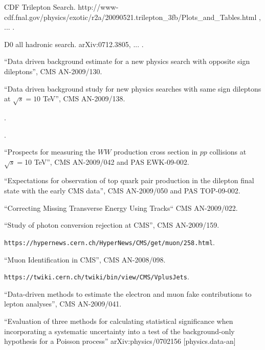 \begin{thebibliography}{99}

 {CDF Trilepton Search. http://www-cdf.fnal.gov/physics/exotic/r2a/20090521.trilepton\_3fb/Plots\_and\_Tables.html }, ... .

 {D0 all hadronic search. arXiv:0712.3805}, ... .


 {``Data driven background estimate for a new physics search with opposite sign dileptons''}, CMS AN-2009/130.

 {``Data driven background study for new physics searches with same sign dileptons at $\sqrt{s} = 10 $ TeV''}, CMS AN-2009/138.

.

.

 {``Prospects for measuring the $WW$ production cross section in $pp$ collisions at $\sqrt s = $10 TeV''}, CMS AN-2009/042 and PAS EWK-09-002.

 {``Expectations for observation of top quark pair production in the dilepton final state with the early CMS data''}, CMS AN-2009/050 and PAS TOP-09-002.

 {``Correcting Missing Transverse Energy Using Tracks``} CMS AN-2009/022.

 {``Study of photon conversion rejection at CMS''}, CMS AN-2009/159.

 {\tt https://hypernews.cern.ch/HyperNews/CMS/get/muon/258.html}.

 {``Muon Identification in CMS''}, CMS AN-2008/098.

 {\tt https://twiki.cern.ch/twiki/bin/view/CMS/VplusJets}.

 {``Data-driven methods to estimate the electron and muon fake contributions to lepton analyses''}, CMS AN-2009/041.

 {``Evaluation of three methods for calculating statistical significance when incorporating a systematic uncertainty into a test of the background-only hypothesis for a Poisson process''} arXiv:physics/0702156 [physics.data-an]


\end{thebibliography}
